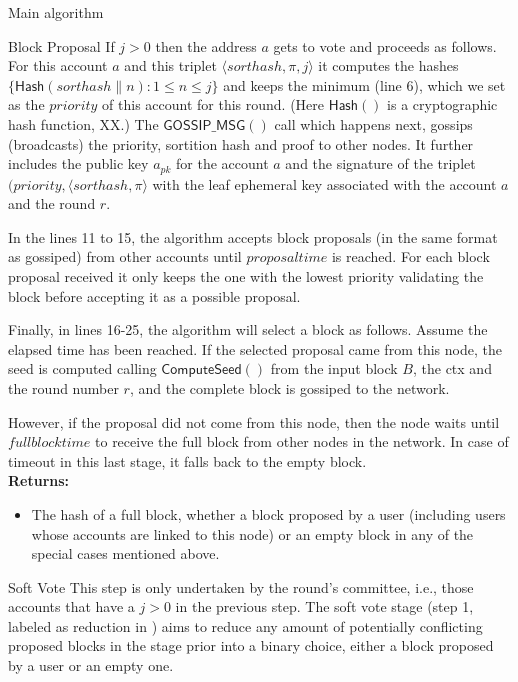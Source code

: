\documentclass[10pt,a4paper]{article}
\begin{document}
\begin{section}{Main algorithm}
\begin{subsection}{Block Proposal}
If $j>0$ then the address $a$ gets to vote and proceeds as follows.
For this account $a$ and this triplet $\langle sorthash, \pi, j\rangle$
it computes the hashes $\{ \mathsf{Hash}(sorthash \| n):1\le n\le j\}$
and keeps the minimum (line 6), which we set as the $priority$ of this
account for this round. (Here $\mathsf{Hash}()$ is a cryptographic hash
function, XX.)
The $\mathsf{GOSSIP\_MSG}()$ call which happens next, gossips (broadcasts) 
the priority, sortition hash and proof to other nodes.
It further includes the public key $a_{pk}$ for the account $a$ and the
signature of the triplet $(priority, \langle sorthash, \pi\rangle$ with the 
leaf ephemeral key associated with the account $a$ and the round $r$.

In the lines 11 to 15, the algorithm accepts block proposals (in the same 
format as gossiped) from other accounts until $proposal time$ is reached.
For each block proposal received it only keeps the one with the lowest 
priority validating the block before accepting it as a possible proposal.

Finally, in lines 16-25, the algorithm will select a block as 
follows. Assume the elapsed time has been reached. 
If the selected proposal came from this node, the seed is computed 
calling $\mathsf{ComputeSeed}()$ from the input block $B$, the ctx and
the round number $r$, and the complete block is gossiped to the network.

However, if the proposal did not come from this node, then the node 
waits until $fullblocktime$ to receive the full block from other nodes
in the network.
In case of timeout in this last stage, it falls back to the empty block.\\

\noindent \textbf{Returns:}
\begin{itemize}
    \item The hash of a full block, whether a block proposed by a user (including users 
    whose accounts are linked to this node) or an empty block in any of the special 
    cases mentioned above.
  \end{itemize}
\end{subsection}
\begin{subsection}{Soft Vote}\label{ssect:softvote}
This step is only undertaken by the round's committee, i.e., those accounts that have
a $j>0$ in the previous step.
The soft vote stage (step 1, labeled as reduction in \cite{DBLP:conf/sosp/GiladHMVZ17}) aims to reduce 
any amount of potentially conflicting proposed blocks in the stage prior into a binary 
choice, either a block proposed by a user or an empty one.
    

\end{subsection}
\end{section}
\end{document}
